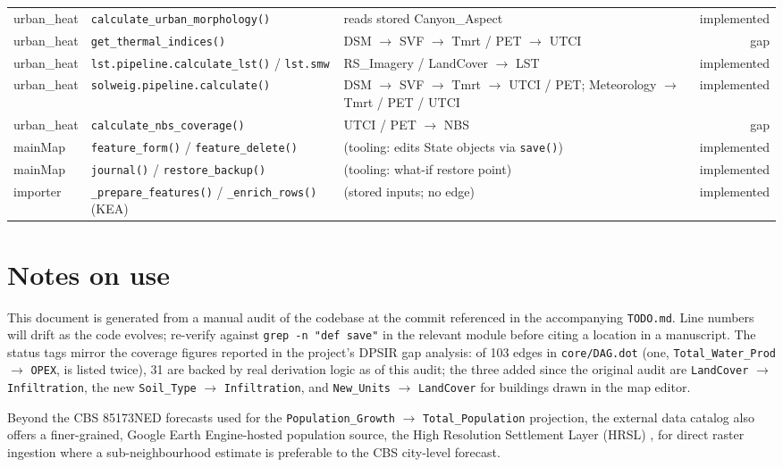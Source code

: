 \documentclass[11pt]{article}
\newcommand{\code}[1]{\texttt{#1}}
\newcommand{\statusdone}{\textcolor{green!50!black}{implemented}}
\newcommand{\statusgap}{\textcolor{red!70!black}{gap}}
\begin{document}
\begin{xltabular}{\linewidth}{l X X r}
urban\_heat & \code{calculate\_urban\_morphology()} & reads stored Canyon\_Aspect & \statusdone{} \\
urban\_heat & \code{get\_thermal\_indices()} & DSM $\to$ SVF $\to$ Tmrt / PET $\to$ UTCI & \statusgap{} \\
urban\_heat & \code{lst.pipeline.calculate\_lst()} / \code{lst.smw} & RS\_Imagery / LandCover $\to$ LST & \statusdone{} \\
urban\_heat & \code{solweig.pipeline.calculate()} & DSM $\to$ SVF $\to$ Tmrt $\to$ UTCI / PET; Meteorology $\to$ Tmrt / PET / UTCI & \statusdone{} \\
urban\_heat & \code{calculate\_nbs\_coverage()} & UTCI / PET $\to$ NBS & \statusgap{} \\
mainMap & \code{feature\_form()} / \code{feature\_delete()} & (tooling: edits State objects via \code{save()}) & \statusdone{} \\
mainMap & \code{journal()} / \code{restore\_backup()} & (tooling: what-if restore point) & \statusdone{} \\
importer & \code{\_prepare\_features()} / \code{\_enrich\_rows()} (KEA) & (stored inputs; no edge) & \statusdone{} \\
\bottomrule
\end{xltabular}
\normalsize

\section*{Notes on use}

This document is generated from a manual audit of the codebase at the commit referenced in the accompanying \code{TODO.md}. Line numbers will drift as the code evolves; re-verify against \code{grep -n "def save"} in the relevant module before citing a location in a manuscript. The status tags mirror the coverage figures reported in the project's DPSIR gap analysis: of 103 edges in \code{core/DAG.dot} (one, \texttt{Total\_Water\_Prod} $\to$ \texttt{OPEX}, is listed twice), 31 are backed by real derivation logic as of this audit; the three added since the original audit are \texttt{LandCover} $\to$ \texttt{Infiltration}, the new \texttt{Soil\_Type} $\to$ \texttt{Infiltration}, and \texttt{New\_Units} $\to$ \texttt{LandCover} for buildings drawn in the map editor.

Beyond the CBS 85173NED forecasts used for the \texttt{Population\_Growth} $\to$ \texttt{Total\_Population} projection, the external data catalog also offers a finer-grained, Google Earth Engine-hosted population source, the High Resolution Settlement Layer (HRSL) \cite{HRSL2016}, for direct raster ingestion where a sub-neighbourhood estimate is preferable to the CBS city-level forecast.
\end{document}
